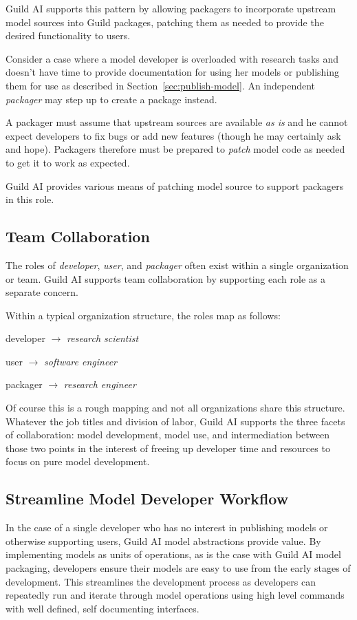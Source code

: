 \documentclass{article}
\begin{document}
Guild AI supports this pattern by allowing packagers to incorporate
upstream model sources into Guild packages, patching them as needed to
provide the desired functionality to users.

Consider a case where a model developer is overloaded with research
tasks and doesn't have time to provide documentation for using her
models or publishing them for use as described in
Section~\ref{sec:publish-model}. An independent \emph{packager} may
step up to create a package instead.

A packager must assume that upstream sources are available \emph{as
  is} and he cannot expect developers to fix bugs or add new features
(though he may certainly ask and hope). Packagers therefore must be
prepared to \emph{patch} model code as needed to get it to work as
expected.

Guild AI provides various means of patching model source to support
packagers in this role.

\subsection{Team Collaboration}

The roles of \emph{developer}, \emph{user}, and \emph{packager} often
exist within a single organization or team. Guild AI supports team
collaboration by supporting each role as a separate concern.

Within a typical organization structure, the roles map as follows:

\setlength{\parindent}{1em}
developer $\rightarrow$ \emph{research scientist}

user $\rightarrow$ \emph{software engineer}

packager $\rightarrow$ \emph{research engineer}
\setlength{\parindent}{0em}

Of course this is a rough mapping and not all organizations share this
structure. Whatever the job titles and division of labor, Guild AI
supports the three facets of collaboration: model development, model
use, and intermediation between those two points in the interest of
freeing up developer time and resources to focus on pure model
development.

\subsection{Streamline Model Developer Workflow}
\label{sec:streamline-workflow}

In the case of a single developer who has no interest in publishing
models or otherwise supporting users, Guild AI model abstractions
provide value. By implementing models as units of operations, as is
the case with Guild AI model packaging, developers ensure their models
are easy to use from the early stages of development. This streamlines
the development process as developers can repeatedly run and iterate
through model operations using high level commands with well defined,
self documenting interfaces.
\end{document}
